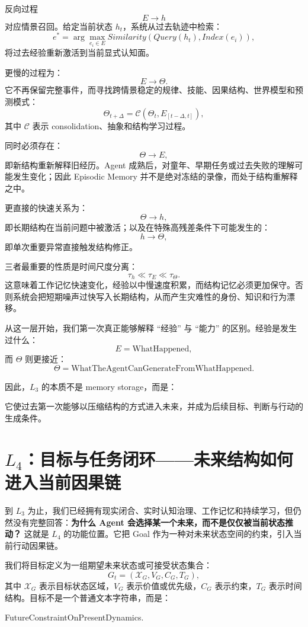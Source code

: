 反向过程
\[
E\rightarrow h
\]
对应情景召回。给定当前状态 $h_t$，系统从过去轨迹中检索：
\[
e^*
=
\arg\max_{e_i\in E}
Similarity
\left(
Query(h_t),
Index(e_i)
\right),
\]
将过去经验重新激活到当前显式认知面。

更慢的过程为：
\[
E\rightarrow\Theta.
\]
它不再保留完整事件，而寻找跨情景稳定的规律、技能、因果结构、世界模型和预测模式：
\[
\Theta_{t+\Delta}
=
\mathcal{C}
\left(
\Theta_t,
E_{[t-\Delta,t]}
\right),
\]
其中 $\mathcal C$ 表示 consolidation、抽象和结构学习过程。

同时必须存在：
\[
\Theta\rightarrow E,
\]
即新结构重新解释旧经历。Agent 成熟后，对童年、早期任务或过去失败的理解可能发生变化；因此 Episodic Memory 并不是绝对冻结的录像，而处于结构重解释之中。

更直接的快速关系为：
\[
\Theta\rightarrow h,
\]
即长期结构在当前问题中被激活；以及在特殊高残差条件下可能发生的：
\[
h\rightarrow\Theta,
\]
即单次重要异常直接触发结构修正。

三者最重要的性质是时间尺度分离：
\[
\boxed{
\tau_h
\ll
\tau_E
\ll
\tau_\Theta.
}
\]
这意味着工作记忆快速变化，经验以中慢速度积累，而结构记忆必须更加保守。否则系统会把短期噪声过快写入长期结构，从而产生灾难性的身份、知识和行为漂移。

从这一层开始，我们第一次真正能够解释 ``经验'' 与 ``能力'' 的区别。经验是发生过什么：
\[
E=\text{WhatHappened},
\]
而 $\Theta$ 则更接近：
\[
\Theta=\text{WhatTheAgentCanGenerateFromWhatHappened}.
\]

因此，$L_3$ 的本质不是 memory storage，而是：
\begin{statementbox}
\centering
{}
\end{statementbox}
它使过去第一次能够以压缩结构的方式进入未来，并成为后续目标、判断与行动的生成条件。

\section{$L_4$：目标与任务闭环——未来结构如何进入当前因果链}

到 $L_3$ 为止，我们已经拥有现实闭合、实时认知治理、工作记忆和持续学习，但仍然没有完整回答：\textbf{为什么 Agent 会选择某一个未来，而不是仅仅被当前状态推动？} 这就是 $L_4$ 的功能位置。它把 Goal 作为一种对未来状态空间的约束，引入当前行动因果链。

我们将目标定义为一组期望未来状态或可接受状态集合：
\[
G_t
=
\left(
\mathcal X_G,
V_G,
C_G,
T_G
\right),
\]
其中 $\mathcal X_G$ 表示目标状态区域，$V_G$ 表示价值或优先级，$C_G$ 表示约束，$T_G$ 表示时间结构。目标不是一个普通文本字符串，而是：
\begin{statementbox}
FutureConstraintOnPresentDynamics.
\end{statementbox}

